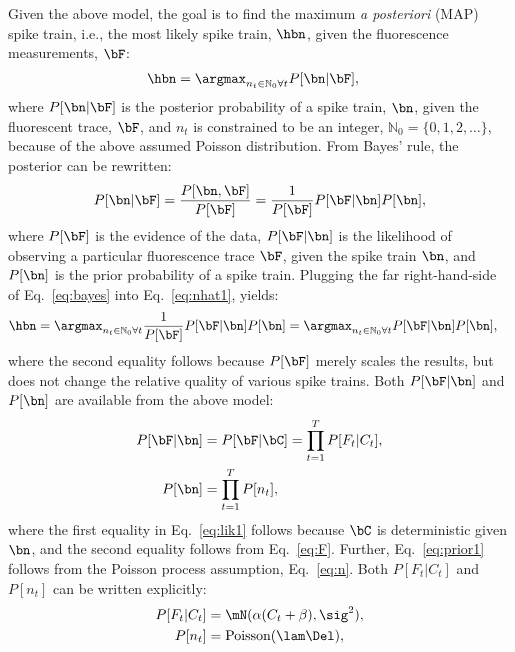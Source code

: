 Given the above model, the goal is to find the maximum \emph{a posteriori} (MAP) spike train, i.e.,  the most likely spike train, $\hbn$,  given the fluorescence measurements, $\bF$:
\begin{align} \label{eq:nhat1} 
\hbn &=  \anx P[\bn | \bF], 
\end{align}
\noindent where $P[\bn | \bF]$ is the posterior probability of a spike train, $\bn$, given the fluorescent trace, $\bF$, and $n_t$ is constrained to be an integer, $\mathbb{N}_0=\{0,1,2,\ldots\}$, because of the above assumed Poisson distribution.  From Bayes' rule, the posterior can be rewritten:
\begin{align} \label{eq:bayes}
P[\bn | \bF] = \frac{P[\bn, \bF]}{P[\bF]} = \frac{1}{P[\bF]} P[\bF | \bn] P[\bn],
\end{align}
\noindent where $P[\bF]$ is the evidence of the data, $P[\bF | \bn]$ is the likelihood of observing a particular fluorescence trace $\bF$, given the spike train $\bn$, and $P[\bn]$ is the prior probability of a spike train.  Plugging the far right-hand-side of Eq.~\eqref{eq:bayes} into Eq.~\eqref{eq:nhat1}, yields:
\begin{align} \label{eq:nhat2} 
\hbn &=  \anx \frac{1}{P[\bF]} P[\bF | \bn] P[\bn] =  \anx  P[\bF | \bn] P[\bn],
\end{align}
\noindent where the second equality follows because $P[\bF]$ merely scales the results, but does not change the relative quality of various spike trains.  Both $P[\bF | \bn]$ and $P[\bn]$ are available from the above model:
\begin{subequations} \label{eq:post1}
\begin{align}
P[\bF | \bn]&= P[\bF | \bC] 	= \prod_{t=1}^T P[F_t | C_t], \label{eq:lik1} \\ 
P[\bn] 		&= \prod_{t=1}^T P[n_t], \label{eq:prior1}
\end{align}
\end{subequations}
\noindent where the first equality in Eq.~\eqref{eq:lik1} follows because $\bC$ is deterministic given $\bn$, and the second equality follows from Eq.~\eqref{eq:F}. Further, Eq.~\eqref{eq:prior1} follows from the Poisson process assumption, Eq.~\eqref{eq:n}.  Both $P[F_t | C_t]$ and $P[n_t]$ can be written explicitly:
\begin{subequations} \label{eq:post2}
\begin{align}
P[F_t | C_t] &= \mN(\alpha(C_t+\beta),\sig^2), \label{eq:lik2} \\
P[n_t] &= \text{Poisson}(\lam \Del), \label{eq:prior2} 
\end{align}
\end{subequations}
